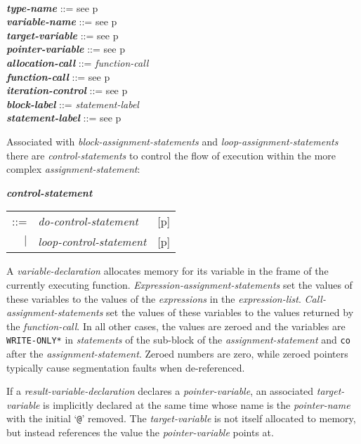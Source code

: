 \documentclass[12pt]{article}
\newcommand{\emkey}[1]{{\em \bfseries #1}}
\newcommand{\pagref}[1]{p\pageref{#1}}
\newenvironment{indpar}[1][0.3in]%
	{\begin{list}{}%
		     {\setlength{\itemsep}{0in}%
		      \setlength{\topsep}{0in}%
		      \setlength{\parsep}{1ex}%
		      \setlength{\labelwidth}{#1}%
		      \setlength{\leftmargin}{#1}%
		      \addtolength{\leftmargin}{\labelsep}}%
	 \item}%
	{\end{list}}
\begin{document}
\begin{indpar}
\\[0.5ex]
\emkey{type-name} ::= see \pagref{TYPE-NAME}
\\[0.5ex]
\emkey{variable-name} ::= see \pagref{VARIABLE-NAME}
\\[0.5ex]
\emkey{target-variable} ::= see \pagref{TARGET-VARIABLE}
\\[0.5ex]
\emkey{pointer-variable} ::= see \pagref{POINTER-VARIABLE}
\\[0.5ex]
\emkey{allocation-call} ::= {\em function-call}
\\[0.5ex]
\emkey{function-call} ::= see \pagref{FUNCTION-CALLS}
\\[0.5ex]
\emkey{iteration-control} ::= see \pagref{ITERATION-CONTROL}
\\[0.5ex]
\emkey{block-label} ::= {\em statement-label}
\\[0.5ex]
\emkey{statement-label} ::= see \pagref{STATEMENT-LABEL}
\end{indpar}

Associated with {\em block-assignment-statements} and
{\em loop-assignment-statements}
there are {\em con\-trol-statements}
to control the flow of execution within the more complex
{\em assignment-state\-ment}:
\begin{indpar}
\emkey{control-statement}\label{CONTROL-STATEMENT}
    \begin{tabular}[t]{@{}rll}
    ::= & {\em do-control-statement}
        & [\pagref{BLOCK-CONTROL-STATEMENT}] \\
    $|$ & {\em loop-control-statement}
        & [\pagref{LOOP-CONTROL-STATEMENT}] \\
    \end{tabular}
\end{indpar}

A {\em variable-declaration} allocates memory for its variable
in the frame of the currently executing function.
{\em Expression-assignment-statements} set the values of these variables
to the values of the {\em expressions} in the {\em expression-list}.
{\em Call-assignment-statements} set the values of these variables
to the values returned by the {\em function-call}.
In all other cases, the values are zeroed and the variables are
{\tt *WRITE-ONLY*} in {\em statements} of the sub-block of the
{\em assignment-statement} and {\tt co} after the
{\em assignment-statement}.
Zeroed numbers are zero, while zeroed pointers typically
cause segmentation faults when de-referenced.

If a {\em result-variable-declaration} declares a {\em pointer-variable},
an associated {\em target-variable} is implicitly declared at the same time
whose name is the {\em pointer-name} with the initial `{\tt @}' removed.
The {\em target-variable} is not itself allocated to memory,
but instead references the value the {\em pointer-variable}
points at.
\end{document}
